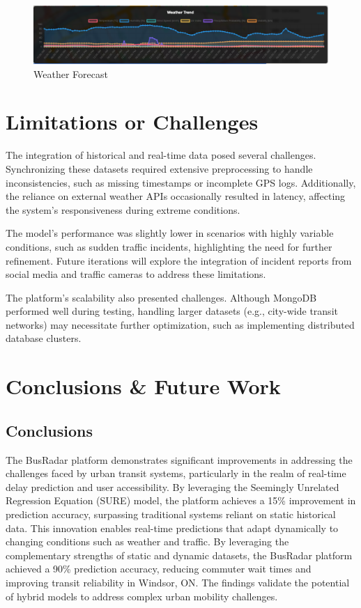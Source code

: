 \documentclass[conference]{IEEEtran}
\begin{document}
\begin{figure}
    \centering
    \includegraphics[width=1\linewidth]{weather.png}
    \caption{Weather Forecast}
    \label{fig:enter-label}
\end{figure}

\section{Limitations or Challenges}
The integration of historical and real-time data posed several challenges. Synchronizing these datasets required extensive preprocessing to handle inconsistencies, such as missing timestamps or incomplete GPS logs. Additionally, the reliance on external weather APIs occasionally resulted in latency, affecting the system’s responsiveness during extreme conditions. 

The model's performance was slightly lower in scenarios with highly variable conditions, such as sudden traffic incidents, highlighting the need for further refinement. Future iterations will explore the integration of incident reports from social media and traffic cameras to address these limitations. 

The platform's scalability also presented challenges. Although MongoDB performed well during testing, handling larger datasets (e.g., city-wide transit networks) may necessitate further optimization, such as implementing distributed database clusters. 

\section{Conclusions \& Future Work}\label{CFW}
\subsection{Conclusions}
The BusRadar platform demonstrates significant improvements in addressing the challenges faced by urban transit systems, particularly in the realm of real-time delay prediction and user accessibility. By leveraging the Seemingly Unrelated Regression Equation (SURE) model, the platform achieves a 15\% improvement in prediction accuracy, surpassing traditional systems reliant on static historical data. This innovation enables real-time predictions that adapt dynamically to changing conditions such as weather and traffic. By leveraging the complementary strengths of static and dynamic datasets, the BusRadar platform achieved a 90\% prediction accuracy, reducing commuter wait times and improving transit reliability in Windsor, ON. The findings validate the potential of hybrid models to address complex urban mobility challenges.
\end{document}
